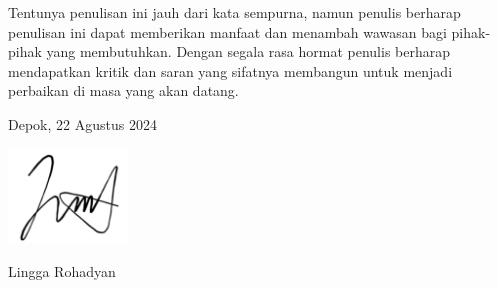 Tentunya penulisan ini jauh dari kata sempurna, namun penulis berharap penulisan ini dapat memberikan manfaat dan menambah wawasan bagi pihak-pihak yang membutuhkan. Dengan segala rasa hormat penulis berharap mendapatkan kritik dan saran yang sifatnya membangun untuk menjadi perbaikan di masa yang akan datang.

\vspace{1cm}
\begin{flushright}
    Depok, 22 Agustus 2024\\
    \begin{afigure}
        \includegraphics[height=2.5cm, right]{images/ttd.png}
    \end{afigure}
    {Lingga Rohadyan}
\end{flushright}